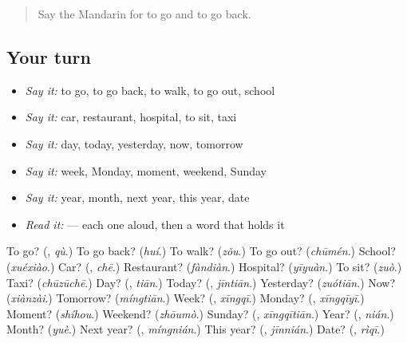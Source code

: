 \label{lesson:ZH-R47-review-43-47}



\begin{quote}
Say the Mandarin for to go and to go back.
\end{quote}

\subsection*{Your turn}
\begin{itemize}
\raggedright
  \item \emph{Say it:} to go, to go back, to walk, to go out, school
  \item \emph{Say it:} car, restaurant, hospital, to sit, taxi
  \item \emph{Say it:} day, today, yesterday, now, tomorrow
  \item \emph{Say it:} week, Monday, moment, weekend, Sunday
  \item \emph{Say it:} year, month, next year, this year, date
  \item \emph{Read it:}         — each one aloud, then a word that holds it
\end{itemize}

\begin{tcolorbox}[breakable,colback=teal!4,colframe=teal!35!black,title={Before you move on}]
To go? (\textbf{}, \emph{qù}.) To go back? (\emph{huí}.) To walk? (\emph{zǒu}.) To go out? (\emph{chūmén}.) School? (\emph{xuéxiào}.) Car? (\textbf{}, \emph{chē}.) Restaurant? (\emph{fàndiàn}.) Hospital? (\emph{yīyuàn}.) To sit? (\emph{zuò}.) Taxi? (\emph{chūzūchē}.) Day? (\textbf{}, \emph{tiān}.) Today? (\textbf{}, \emph{jīntiān}.) Yesterday? (\emph{zuótiān}.) Now? (\emph{xiànzài}.) Tomorrow? (\emph{míngtiān}.) Week? (\textbf{}, \emph{xīngqī}.) Monday? (\textbf{}, \emph{xīngqīyī}.) Moment? (\emph{shíhou}.) Weekend? (\emph{zhōumò}.) Sunday? (\textbf{}, \emph{xīngqītiān}.) Year? (\textbf{}, \emph{nián}.) Month? (\emph{yuè}.) Next year? (\textbf{}, \emph{míngnián}.) This year? (\textbf{}, \emph{jīnnián}.) Date? (\textbf{}, \emph{rìqī}.)
\end{tcolorbox}
